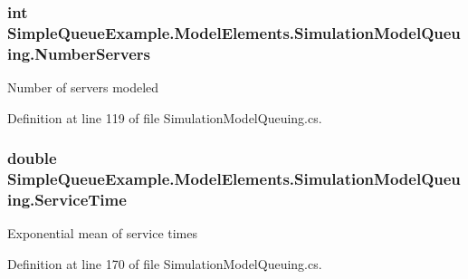 \subsubsection[{\texorpdfstring{Number\+Servers}{NumberServers}}]{\setlength{\rightskip}{0pt plus 5cm}int Simple\+Queue\+Example.\+Model\+Elements.\+Simulation\+Model\+Queuing.\+Number\+Servers\hspace{0.3cm}{\ttfamily [get]}}\hypertarget{class_simple_queue_example_1_1_model_elements_1_1_simulation_model_queuing_a539c113ca222d4a332be24d01052afc4}{}\label{class_simple_queue_example_1_1_model_elements_1_1_simulation_model_queuing_a539c113ca222d4a332be24d01052afc4}


Number of servers modeled 



Definition at line 119 of file Simulation\+Model\+Queuing.\+cs.

\subsubsection[{\texorpdfstring{Service\+Time}{ServiceTime}}]{\setlength{\rightskip}{0pt plus 5cm}double Simple\+Queue\+Example.\+Model\+Elements.\+Simulation\+Model\+Queuing.\+Service\+Time\hspace{0.3cm}{\ttfamily [get]}}\hypertarget{class_simple_queue_example_1_1_model_elements_1_1_simulation_model_queuing_a940efd865f62041512942c0aaace6ced}{}\label{class_simple_queue_example_1_1_model_elements_1_1_simulation_model_queuing_a940efd865f62041512942c0aaace6ced}


Exponential mean of service times 



Definition at line 170 of file Simulation\+Model\+Queuing.\+cs.

